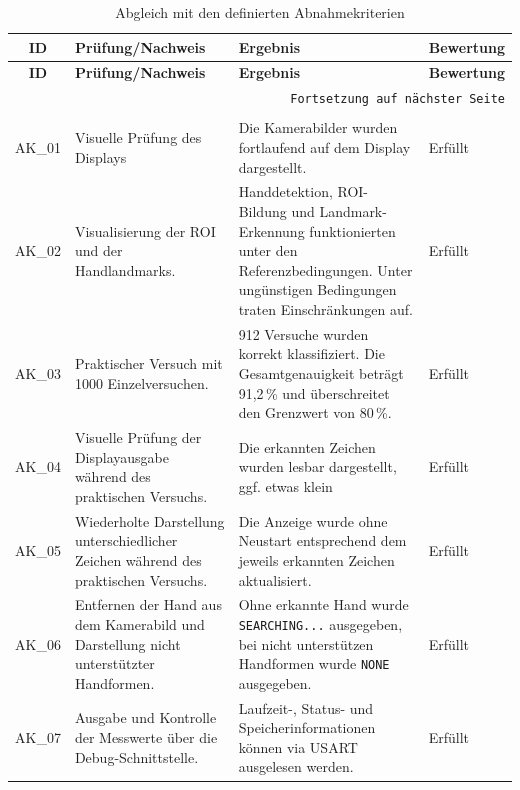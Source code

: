 \begin{longtable}{|c|p{}|p{}|p{}|}
    \hline
    \textbf{ID} &
    \textbf{Prüfung/Nachweis} &
    \textbf{Ergebnis} &
    \textbf{Bewertung} \\
    \hline
    \endfirsthead
    \hline
    \textbf{ID} &
    \textbf{Prüfung/Nachweis} &
    \textbf{Ergebnis} &
    \textbf{Bewertung} \\
    \hline
    \endhead
    \hline
    \multicolumn{4}{r}{\texttt{Fortsetzung auf nächster Seite}} \\
    \endfoot
    \caption{Abgleich mit den definierten Abnahmekriterien}
    \label{tab:abgleich-abnahmekriterien} \\
    \endlastfoot

    AK\_01 &
    Visuelle Prüfung des Displays &
    Die Kamerabilder wurden fortlaufend auf dem Display dargestellt. &
    Erfüllt \\
    \hline

    AK\_02 &
    Visualisierung der ROI und der Handlandmarks. &
    Handdetektion, ROI-Bildung und Landmark-Erkennung funktionierten unter den Referenzbedingungen. Unter ungünstigen Bedingungen traten Einschränkungen auf. &
    Erfüllt \\
    \hline

    AK\_03 &
    Praktischer Versuch mit 1000 Einzelversuchen. &
    912 Versuche wurden korrekt klassifiziert. Die Gesamtgenauigkeit beträgt 91,2\,\% und überschreitet den Grenzwert von 80\,\%. &
    Erfüllt \\
    \hline

    AK\_04 &
    Visuelle Prüfung der Displayausgabe während des praktischen Versuchs. &
    Die erkannten Zeichen wurden lesbar dargestellt, ggf. etwas klein &
    Erfüllt \\
    \hline

    AK\_05 &
    Wiederholte Darstellung unterschiedlicher Zeichen während des praktischen Versuchs. &
    Die Anzeige wurde ohne Neustart entsprechend dem jeweils erkannten Zeichen aktualisiert. &
    Erfüllt \\
    \hline

    AK\_06 &
    Entfernen der Hand aus dem Kamerabild und Darstellung nicht unterstützter Handformen. &
    Ohne erkannte Hand wurde \texttt{SEARCHING...} ausgegeben, bei nicht unterstützen Handformen wurde \texttt{NONE} ausgegeben. &
    Erfüllt \\
    \hline

    AK\_07 &
    Ausgabe und Kontrolle der Messwerte über die Debug-Schnittstelle. &
    Laufzeit-, Status- und Speicherinformationen können via USART ausgelesen werden. &
    Erfüllt \\
    \hline


\end{longtable}
